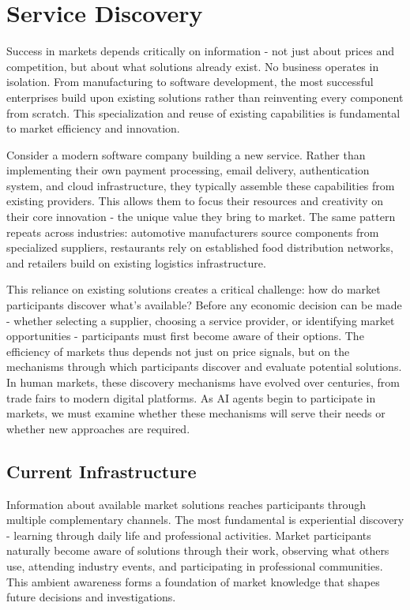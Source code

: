 \documentclass{article}
\begin{document}
\section{Service Discovery}
\label{sec:service_discovery}



Success in markets depends critically on information - not just about prices and competition, but about what solutions already exist. No business operates in isolation. From manufacturing to software development, the most successful enterprises build upon existing solutions rather than reinventing every component from scratch. This specialization and reuse of existing capabilities is fundamental to market efficiency and innovation.

Consider a modern software company building a new service. Rather than implementing their own payment processing, email delivery, authentication system, and cloud infrastructure, they typically assemble these capabilities from existing providers. This allows them to focus their resources and creativity on their core innovation - the unique value they bring to market. The same pattern repeats across industries: automotive manufacturers source components from specialized suppliers, restaurants rely on established food distribution networks, and retailers build on existing logistics infrastructure.

This reliance on existing solutions creates a critical challenge: how do market participants discover what's available? Before any economic decision can be made - whether selecting a supplier, choosing a service provider, or identifying market opportunities - participants must first become aware of their options. The efficiency of markets thus depends not just on price signals, but on the mechanisms through which participants discover and evaluate potential solutions. In human markets, these discovery mechanisms have evolved over centuries, from trade fairs to modern digital platforms. As AI agents begin to participate in markets, we must examine whether these mechanisms will serve their needs or whether new approaches are required.


\subsection{Current Infrastructure}
\label{subsec:discovery_current}
Information about available market solutions reaches participants through multiple complementary channels. The most fundamental is experiential discovery - learning through daily life and professional activities. Market participants naturally become aware of solutions through their work, observing what others use, attending industry events, and participating in professional communities. This ambient awareness forms a foundation of market knowledge that shapes future decisions and investigations.
\end{document}
